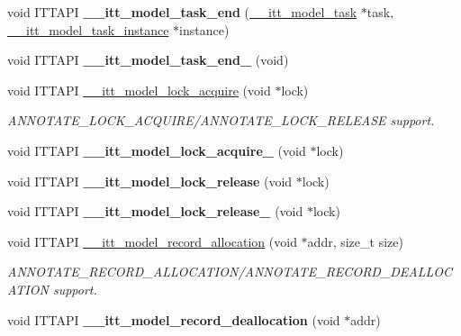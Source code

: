 \begin{DoxyCompactItemize}
\item 
\hypertarget{group__model_ga2feec792701efd0cd53ea7dfb2d8a2a2}{}void I\+T\+T\+A\+P\+I {\bfseries \+\_\+\+\_\+itt\+\_\+model\+\_\+task\+\_\+end} (\hyperlink{group__model_ga96b1dc87978dfc08d2f7740f9d3d2196}{\+\_\+\+\_\+itt\+\_\+model\+\_\+task} $\ast$task, \hyperlink{group__model_ga649e02ad732b5bfc895a239353d09588}{\+\_\+\+\_\+itt\+\_\+model\+\_\+task\+\_\+instance} $\ast$instance)\label{group__model_ga2feec792701efd0cd53ea7dfb2d8a2a2}

\item 
\hypertarget{group__model_ga8cf5327f38fb174cb59b648f17e417a9}{}void I\+T\+T\+A\+P\+I {\bfseries \+\_\+\+\_\+itt\+\_\+model\+\_\+task\+\_\+end\+\_} (void)\label{group__model_ga8cf5327f38fb174cb59b648f17e417a9}

\item 
void I\+T\+T\+A\+P\+I \hyperlink{group__model_ga36976a311ffa90e59ec5b9122bd79963}{\+\_\+\+\_\+itt\+\_\+model\+\_\+lock\+\_\+acquire} (void $\ast$lock)
\begin{DoxyCompactList}\small\item\em A\+N\+N\+O\+T\+A\+T\+E\+\_\+\+L\+O\+C\+K\+\_\+\+A\+C\+Q\+U\+I\+R\+E/\+A\+N\+N\+O\+T\+A\+T\+E\+\_\+\+L\+O\+C\+K\+\_\+\+R\+E\+L\+E\+A\+S\+E support. \end{DoxyCompactList}\item 
\hypertarget{group__model_gaee0795006c12172e0726bbe1b052b64d}{}void I\+T\+T\+A\+P\+I {\bfseries \+\_\+\+\_\+itt\+\_\+model\+\_\+lock\+\_\+acquire\+\_} (void $\ast$lock)\label{group__model_gaee0795006c12172e0726bbe1b052b64d}

\item 
\hypertarget{group__model_ga57b59ce957b207bd68bbe1a40ff43e72}{}void I\+T\+T\+A\+P\+I {\bfseries \+\_\+\+\_\+itt\+\_\+model\+\_\+lock\+\_\+release} (void $\ast$lock)\label{group__model_ga57b59ce957b207bd68bbe1a40ff43e72}

\item 
\hypertarget{group__model_gaa3c9a6278f8e680ba60394dae6f2c725}{}void I\+T\+T\+A\+P\+I {\bfseries \+\_\+\+\_\+itt\+\_\+model\+\_\+lock\+\_\+release\+\_} (void $\ast$lock)\label{group__model_gaa3c9a6278f8e680ba60394dae6f2c725}

\item 
void I\+T\+T\+A\+P\+I \hyperlink{group__model_gae05bef073667cfa3d5713103a5256e27}{\+\_\+\+\_\+itt\+\_\+model\+\_\+record\+\_\+allocation} (void $\ast$addr, size\+\_\+t size)
\begin{DoxyCompactList}\small\item\em A\+N\+N\+O\+T\+A\+T\+E\+\_\+\+R\+E\+C\+O\+R\+D\+\_\+\+A\+L\+L\+O\+C\+A\+T\+I\+O\+N/\+A\+N\+N\+O\+T\+A\+T\+E\+\_\+\+R\+E\+C\+O\+R\+D\+\_\+\+D\+E\+A\+L\+L\+O\+C\+A\+T\+I\+O\+N support. \end{DoxyCompactList}\item 
\hypertarget{group__model_ga02ec434226d34bd3776173025af69283}{}void I\+T\+T\+A\+P\+I {\bfseries \+\_\+\+\_\+itt\+\_\+model\+\_\+record\+\_\+deallocation} (void $\ast$addr)\label{group__model_ga02ec434226d34bd3776173025af69283}


\end{DoxyCompactItemize}
